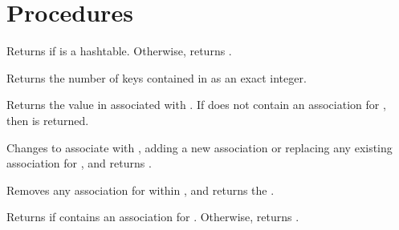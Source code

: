 \section{Procedures}

\begin{entry}{%
}

Returns \schtrue{} if  is a hashtable.
Otherwise, returns \schfalse{}.
\end{entry}

\begin{entry}{}

Returns the number of keys contained in  as an exact integer.
\end{entry}

\begin{entry}{%
}

Returns the value in  associated with .
If  does not contain an association for ,
then  is returned.
\end{entry}

\begin{entry}{}

Changes  to associate  with ,
adding a new association or replacing any existing association for ,
and returns \unspecifiedreturn.
\end{entry}

\begin{entry}{}

Removes any association for  within , and
returns the \unspecifiedreturn.
\end{entry}

\begin{entry}{}

Returns \schtrue{} if  contains an association
for .  Otherwise, returns \schfalse{}.
\end{entry}

